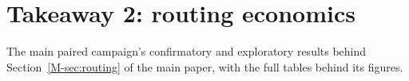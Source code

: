 \section{Takeaway 2: routing economics}\label{sec:c}

The main paired campaign's confirmatory and exploratory results behind Section~\ref{M-sec:routing} of the main paper,
with the full tables behind its figures.







